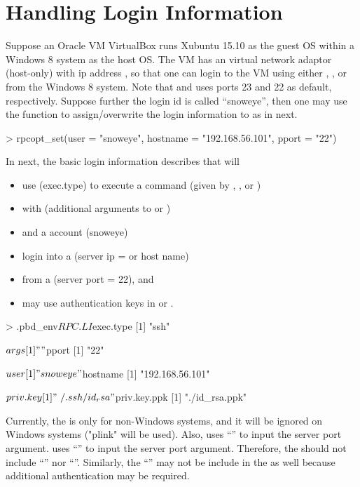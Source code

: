 \section[Handling Login Information]{Handling Login Information}
\label{sec:handling_login_information}

Suppose an Oracle VM VirtualBox runs Xubuntu 15.10 as the guest OS within a
Windows 8 system as the host OS.
The VM has an virtual network adaptor (host-only)
with ip address , so that one can
login to the VM using either , , or 
from the Windows 8 system.
Note that  and  uses ports 23 and 22 as default,
respectively.
Suppose further the login id is called ``snoweye'', then one may use
the function  to assign/overwrite the login information to
 as in next.
\begin{Code}[title=Set login information]
> rpcopt_set(user = "snoweye", hostname = "192.168.56.101", pport = "22")
\end{Code}

In next, the basic login information  describes that
 will
\begin{itemize}
\item use  (exec.type) to execute a command
      (given by , , or )
\item with  (additional arguments to  or )
\item and a  account (snoweye)
\item login into a  (server ip =  or
      host name)
\item from a  (server port = 22), and
\item may use authentication keys in  or .
\end{itemize}
\begin{Code}[title=Basic \code{RPC.LI}]
> .pbd_env$RPC.LI
$exec.type
[1] "ssh"

$args
[1] ""

$pport
[1] "22"

$user
[1] "snoweye"

$hostname
[1] "192.168.56.101"

$priv.key
[1] "~/.ssh/id_rsa"

$priv.key.ppk
[1] "./id_rsa.ppk"
\end{Code}
Currently, the  is only for non-Windows systems, and it
will be ignored on Windows systems ("plink" will be used).
Also,  uses ``'' to input the server port argument.
 uses ``'' to input the server port argument.
Therefore, the  should not include ``'' nor ``''.
Similarly, the ``'' may not be include in the  as well
because additional authentication may be required.

